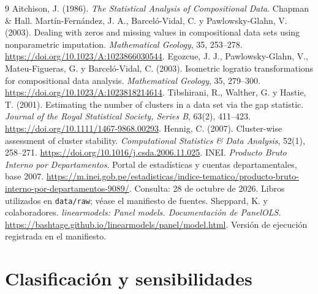 \begin{thebibliography}{9}
 Aitchison, J. (1986). \textit{The Statistical Analysis of Compositional Data}. Chapman \& Hall.
 Martín-Fernández, J. A., Barceló-Vidal, C. y Pawlowsky-Glahn, V. (2003). Dealing with zeros and missing values in compositional data sets using nonparametric imputation. \textit{Mathematical Geology}, 35, 253--278. \url{https://doi.org/10.1023/A:1023866030544}.
 Egozcue, J. J., Pawlowsky-Glahn, V., Mateu-Figueras, G. y Barceló-Vidal, C. (2003). Isometric logratio transformations for compositional data analysis. \textit{Mathematical Geology}, 35, 279--300. \url{https://doi.org/10.1023/A:1023818214614}.
 Tibshirani, R., Walther, G. y Hastie, T. (2001). Estimating the number of clusters in a data set via the gap statistic. \textit{Journal of the Royal Statistical Society, Series B}, 63(2), 411--423. \url{https://doi.org/10.1111/1467-9868.00293}.
 Hennig, C. (2007). Cluster-wise assessment of cluster stability. \textit{Computational Statistics \& Data Analysis}, 52(1), 258--271. \url{https://doi.org/10.1016/j.csda.2006.11.025}.
 INEI. \textit{Producto Bruto Interno por Departamentos}. Portal de estadísticas y cuentas departamentales, base 2007. \url{https://m.inei.gob.pe/estadisticas/indice-tematico/producto-bruto-interno-por-departamentos-9089/}. Consulta: 28 de octubre de 2026. Libros utilizados en \texttt{data/raw}; véase el manifiesto de fuentes.
 Sheppard, K. y colaboradores. \textit{linearmodels: Panel models. Documentación de PanelOLS}. \url{https://bashtage.github.io/linearmodels/panel/model.html}. Versión de ejecución registrada en el manifiesto.
\end{thebibliography}
\clearpage
\appendix
\section{Clasificación y sensibilidades}
\begin{table}[htbp]\centering\small
\caption{Miembros de los perfiles Ward K=4}\end{table}
\begin{table}[htbp]\centering\small
\caption{Validación de Ward sobre PCA2}
\end{table}
\begin{table}[htbp]\centering\small
\caption{Sensibilidad de K=4}
\end{table}
\FloatBarrier
{}
\FloatBarrier
